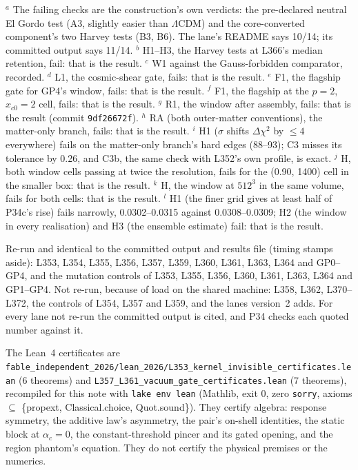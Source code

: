 \documentclass[10pt]{article}
\newcommand{\fpath}[1]{\nolinkurl{#1}}
\begin{document}
{$^a$ The failing checks are the construction's own verdicts: the pre-declared neutral El Gordo test (A3, slightly easier than $\Lambda$CDM) and the core-converted component's two Harvey tests (B3, B6). The lane's README says 10/14; its committed output says 11/14. $^b$ H1--H3, the Harvey tests at L366's median retention, fail: that is the result. $^c$ W1 against the Gauss-forbidden comparator, recorded. $^d$ L1, the cosmic-shear gate, fails: that is the result. $^e$ F1, the flagship gate for GP4's window, fails: that is the result. $^f$ F1, the flagship at the $p=2$, $x_{c0}=2$ cell, fails: that is the result. $^g$ R1, the window after assembly, fails: that is the result (commit \texttt{9df26672f}). $^h$ RA (both outer-matter conventions), the matter-only branch, fails: that is the result. $^i$ H1 ($\sigma$ shifts $\Delta\chi^2$ by $\leq4$ everywhere) fails on the matter-only branch's hard edges (88--93); C3 misses its tolerance by 0.26, and C3b, the same check with L352's own profile, is exact. $^j$ H, both window cells passing at twice the resolution, fails for the (0.90, 1400) cell in the smaller box: that is the result. $^k$ H, the window at $512^3$ in the same volume, fails for both cells: that is the result. $^l$ H1 (the finer grid gives at least half of P34c's rise) fails narrowly, 0.0302--0.0315 against 0.0308--0.0309; H2 (the window in every realisation) and H3 (the ensemble estimate) fail: that is the result. \par Re-run and identical to the committed output and results file (timing stamps aside): L353, L354, L355, L356, L357, L359, L360, L361, L363, L364 and GP0--GP4, and the mutation controls of L353, L355, L356, L360, L361, L363, L364 and GP1--GP4. Not re-run, because of load on the shared machine: L358, L362, L370--L372, the controls of L354, L357 and L359, and the lanes version~2 adds. For every lane not re-run the committed output is cited, and P34 checks each quoted number against it.
}

\smallskip
The Lean~4 certificates are \fpath{fable_independent_2026/lean_2026/L353_kernel_invisible_certificates.lean} (6 theorems) and \fpath{L357_L361_vacuum_gate_certificates.lean} (7 theorems), recompiled for this note with \texttt{lake env lean} (Mathlib, exit 0, zero \texttt{sorry}, axioms $\subseteq$ \{propext, Classical.choice, Quot.sound\}). They certify algebra: response symmetry, the additive law's asymmetry, the pair's on-shell identities, the static block at $\alpha_c=0$, the constant-threshold pincer and its gated opening, and the region phantom's equation. They do not certify the physical premises or the numerics.
\end{document}
